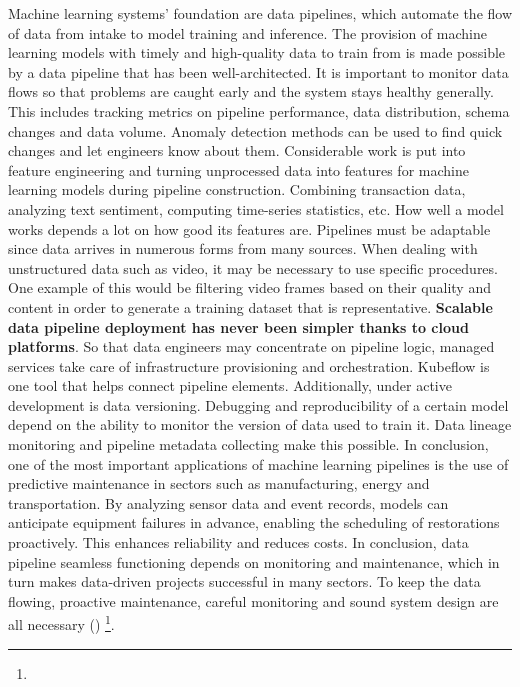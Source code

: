 Machine learning systems' foundation are data pipelines, which automate the flow of data from intake to model training and inference. The provision of machine learning models with timely and high-quality data to train from is made possible by a data pipeline that has been well-architected. It is important to monitor data flows so that problems are caught early and the system stays healthy generally. This includes tracking metrics on pipeline performance, data distribution, schema changes and data volume. Anomaly detection methods can be used to find quick changes and let engineers know about them. Considerable work is put into feature engineering and turning unprocessed data into features for machine learning models during pipeline construction. Combining transaction data, analyzing text sentiment, computing time-series statistics, etc. How well a model works depends a lot on how good its features are. Pipelines must be adaptable since data arrives in numerous forms from many sources. When dealing with unstructured data such as video, it may be necessary to use specific procedures. One example of this would be filtering video frames based on their quality and content in order to generate a training dataset that is representative. \textbf{Scalable data pipeline deployment has never been simpler thanks to cloud platforms}. So that data engineers may concentrate on pipeline logic, managed services take care of infrastructure provisioning and orchestration. Kubeflow is one tool that helps connect pipeline elements. Additionally, under active development is data versioning. Debugging and reproducibility of a certain model depend on the ability to monitor the version of data used to train it. Data lineage monitoring and pipeline metadata collecting make this possible. In conclusion, one of the most important applications of machine learning pipelines is the use of predictive maintenance in sectors such as manufacturing, energy and transportation. By analyzing sensor data and event records, models can anticipate equipment failures in advance, enabling the scheduling of restorations proactively. This enhances reliability and reduces costs. In conclusion, data pipeline seamless functioning depends on monitoring and maintenance, which in turn makes data-driven projects successful in many sectors. To keep the data flowing, proactive maintenance, careful monitoring and sound system design are all necessary (\cite{roychowdhury2021videodata}) \footnote[25]{}.